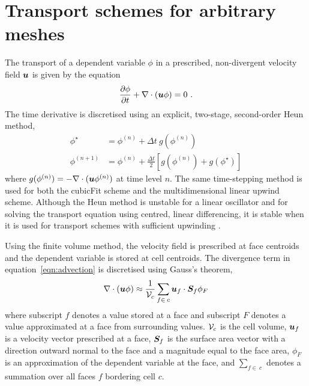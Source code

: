 \section{Transport schemes for arbitrary meshes}
\label{sec:cubicFit:transport}

The transport of a dependent variable $\phi$ in a prescribed, non-divergent velocity field $\bm{u}$ is given by the equation		
\begin{align}		
	\frac{\partial \phi}{\partial t} + \nabla \cdot \left( \bm{u} \phi \right) = 0 \text{ .} \label{eqn:advection}		
\end{align}
The time derivative is discretised using an explicit, two-stage, second-order Heun method,
\begin{subequations}
\begin{align}
	\phi^\star &= \phi^{(n)} + \Delta t \: g(\phi^{(n)}) \\
	\phi^{(n+1)} &= \phi^{(n)} + \frac{\Delta t}{2} \left[ g(\phi^{(n)}) + g(\phi^{\star}) \right]
\end{align} \label{eqn:heun}
\end{subequations}
\unskip where \(g(\phi^{(n)}) = - \nabla \cdot (\bm{u} \phi^{(n)})\) at time level \(n\).
The same time-stepping method is used for both the cubicFit scheme and the multidimensional linear upwind scheme.
Although the Heun method is unstable for a linear oscillator \citep{durran2013} and for solving the transport equation using centred, linear differencing, it is stable when it is used for transport schemes with sufficient upwinding \citep[p. 149]{hundsdorfer-verwer2013}.

Using the finite volume method, the velocity field is prescribed at face centroids and the dependent variable is stored at cell centroids.  The divergence term in equation~\eqref{eqn:advection} is discretised using Gauss's theorem,
\begin{align}
	\nabla \cdot \left( \bm{u} \phi \right) \approx \frac{1}{\mathcal{V}_c} \sum_{f \in\:c} \bm{u}_f \cdot \bm{S}_f \phi_F \label{eqn:gauss-div}
\end{align}
where subscript $f$ denotes a value stored at a face and subscript $F$ denotes a value approximated at a face from surrounding values.  $\mathcal{V}_c$ is the cell volume, $\bm{u}_f$ is a velocity vector prescribed at a face, $\bm{S}_f$ is the surface area vector with a direction outward normal to the face and a magnitude equal to the face area, $\phi_F$ is an approximation of the dependent variable at the face, and $\sum_{f \in\:c}$ denotes a summation over all faces $f$ bordering cell $c$.


